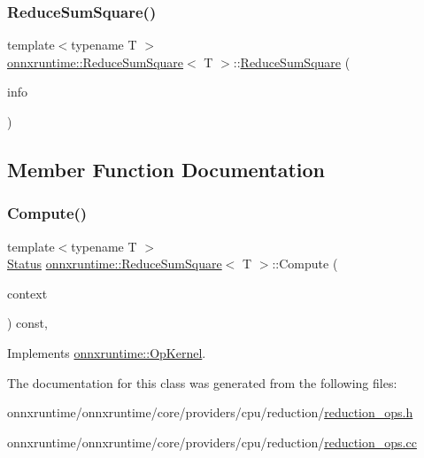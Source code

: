 \subsubsection{\texorpdfstring{Reduce\+Sum\+Square()}{ReduceSumSquare()}}
{\footnotesize\ttfamily template$<$typename T $>$ \\
\mbox{\hyperlink{classonnxruntime_1_1ReduceSumSquare}{onnxruntime\+::\+Reduce\+Sum\+Square}}$<$ T $>$\+::\mbox{\hyperlink{classonnxruntime_1_1ReduceSumSquare}{Reduce\+Sum\+Square}} (\begin{DoxyParamCaption}\item[{const \mbox{\hyperlink{classonnxruntime_1_1OpKernelInfo}{Op\+Kernel\+Info}} \&}]{info }\end{DoxyParamCaption})\hspace{0.3cm}{\ttfamily [inline]}}



\subsection{Member Function Documentation}
\mbox{\label{classonnxruntime_1_1ReduceSumSquare_aeb7e5a975972928096669113a7ef7f38}} 
\subsubsection{\texorpdfstring{Compute()}{Compute()}}
{\footnotesize\ttfamily template$<$typename T $>$ \\
\mbox{\hyperlink{classonnxruntime_1_1common_1_1Status}{Status}} \mbox{\hyperlink{classonnxruntime_1_1ReduceSumSquare}{onnxruntime\+::\+Reduce\+Sum\+Square}}$<$ T $>$\+::Compute (\begin{DoxyParamCaption}\item[{\mbox{\hyperlink{classonnxruntime_1_1OpKernelContext}{Op\+Kernel\+Context}} $\ast$}]{context }\end{DoxyParamCaption}) const\hspace{0.3cm}{\ttfamily [override]}, {\ttfamily [virtual]}}



Implements \mbox{\hyperlink{classonnxruntime_1_1OpKernel_a9eca8656a78b1b3ab9d3351a12798650}{onnxruntime\+::\+Op\+Kernel}}.



The documentation for this class was generated from the following files\+:\begin{DoxyCompactItemize}
\item 
onnxruntime/onnxruntime/core/providers/cpu/reduction/\mbox{\hyperlink{cpu_2reduction_2reduction__ops_8h}{reduction\+\_\+ops.\+h}}\item 
onnxruntime/onnxruntime/core/providers/cpu/reduction/\mbox{\hyperlink{cpu_2reduction_2reduction__ops_8cc}{reduction\+\_\+ops.\+cc}}\end{DoxyCompactItemize}
